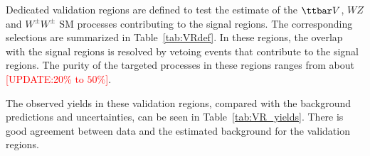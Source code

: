 Dedicated validation regions are defined to test the estimate of the $\ttbar V$, $WZ$ and $W^\pm W^\pm$ SM processes contributing to the signal regions. The corresponding selections are summarized in Table~\ref{tab:VRdef}. 
In these regions, the overlap with the signal regions is resolved by vetoing events that contribute to the signal regions.  
The purity of the targeted processes in these regions ranges from about \textcolor{red}{[UPDATE:20\% to $50\%$]}. 

The observed yields in these validation regions, compared with the background predictions and uncertainties, 
can be seen in Table~\ref{tab:VR_yields}.
There is good agreement between data and the estimated background for the validation regions.

